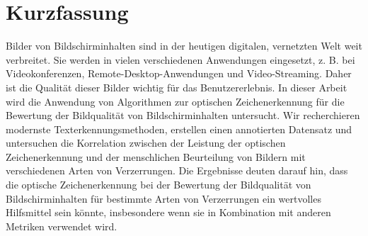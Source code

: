 \chapter{Kurzfassung}

Bilder von Bildschirminhalten sind in der heutigen digitalen, vernetzten Welt weit verbreitet.
Sie werden in vielen verschiedenen Anwendungen eingesetzt, z. B. bei Videokonferenzen, Remote-Desktop-Anwendungen und Video-Streaming.
Daher ist die Qualität dieser Bilder wichtig für das Benutzererlebnis.
In dieser Arbeit wird die Anwendung von Algorithmen zur optischen Zeichenerkennung für die Bewertung der Bildqualität von Bildschirminhalten untersucht.
Wir recherchieren modernste Texterkennungsmethoden, erstellen einen annotierten Datensatz und untersuchen die Korrelation zwischen der Leistung der optischen Zeichenerkennung und der menschlichen Beurteilung von Bildern mit verschiedenen Arten von Verzerrungen.
Die Ergebnisse deuten darauf hin, dass die optische Zeichenerkennung bei der Bewertung der Bildqualität von Bildschirminhalten für bestimmte Arten von Verzerrungen ein wertvolles Hilfsmittel sein könnte, insbesondere wenn sie in Kombination mit anderen Metriken verwendet wird.
